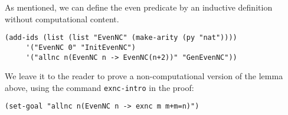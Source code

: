 \documentclass[12pt]{amsart}
\newcommand{\inquotes}[1]{``#1''}
\begin{document}
As mentioned, we can define the even predicate by an inductive
definition without computational content.
\begin{verbatim}
(add-ids (list (list "EvenNC" (make-arity (py "nat"))))
	 '("EvenNC 0" "InitEvenNC")
	 '("allnc n(EvenNC n -> EvenNC(n+2))" "GenEvenNC"))
\end{verbatim}
We leave it to the reader to prove a non-computational version of the
lemma above, using the command \verb|exnc-intro| in the proof:
\begin{verbatim}
(set-goal "allnc n(EvenNC n -> exnc m m+m=n)")
\end{verbatim}

\end{document}
